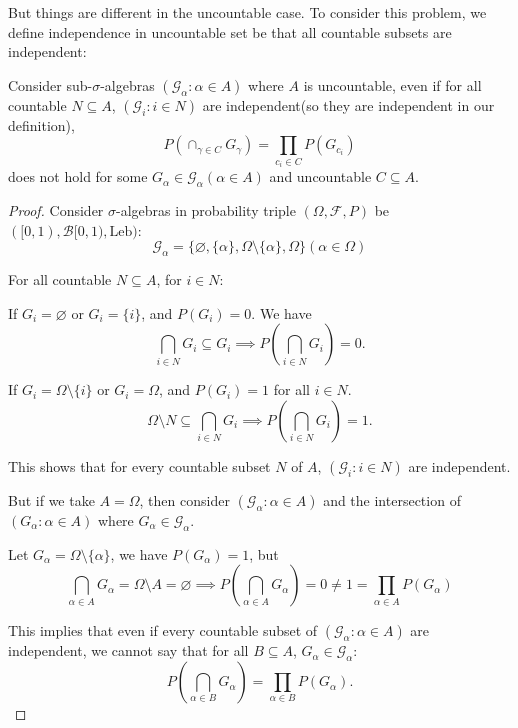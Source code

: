\documentclass[UTF8, a4paper, linespread=1.5]{article}
\begin{document}
But things are different in the uncountable case. To consider this problem, we define independence in uncountable set be that all countable subsets are independent:
\begin{thm}{}{}
    Consider sub-$\sigma$-algebras $(\mathcal{G}_\alpha :\alpha \in A)$ where $A$ is uncountable, even if
    for all countable $N \subseteq A$, $(\mathcal G_i: i \in N)$ are independent(so they are independent in our definition), 
    $$P(\cap_{\gamma\in C}G_\gamma)=\prod_{c_i\in C}P(G_{c_i})$$
    does not hold for some $G_\alpha \in\mathcal G_\alpha(\alpha \in A) $ and uncountable $C\subseteq A$.
\end{thm}
\begin{proof}[Proof]
    Consider $\sigma $-algebras in probability triple $(\Omega ,\mathcal F, P)$ be $([0,1), \mathcal B[0,1), \text{Leb})$:
    $$\mathcal G_\alpha = \{\varnothing, \{\alpha \}, \Omega \setminus \{\alpha \} , \Omega  \}(\alpha \in \Omega )$$

    For all countable $N \subseteq A$, for $i \in N$:

    If $G_i = \varnothing$ or $G_i = \{i \} $, and $P(G_i) = 0$. We have 
    $$\bigcap_{i \in N} G_i \subseteq G_i \implies P(\bigcap_{i \in N} G_i) = 0.$$

    If $G_i = \Omega \setminus\{i\}$ or $G_i = \Omega$, and $P(G_i) = 1$ for all $i \in N$. 
    $$\Omega \setminus N \subseteq \bigcap_{i\in N} G_i \implies P(\bigcap_{i \in N} G_i) = 1.$$

    This shows that for every countable subset $N$ of $A$, $(\mathcal G_i: i \in N)$ are independent.

    But if we take $A = \Omega $, then consider $(\mathcal G_\alpha : \alpha \in A)$ and the intersection of $(G_\alpha :\alpha \in A)$ where $G_\alpha \in \mathcal G_\alpha$.

    Let $G_\alpha  = \Omega \setminus \{\alpha \} $, we have $P(G_\alpha ) = 1$, but
    $$\bigcap_{\alpha \in A}G_\alpha = \Omega \setminus A = \varnothing \implies P(\bigcap_{\alpha \in A } G_\alpha ) = 0 \neq 1 = \prod_{\alpha \in A} P(G_\alpha)  $$

    This implies that even if every countable subset of $(\mathcal G_\alpha :\alpha \in A)$ are independent, we cannot say that for all $B \subseteq A$, $G_\alpha  \in \mathcal G_\alpha$:
    $$P(\bigcap_{\alpha \in B} G_\alpha ) = \prod_{\alpha \in B} P(G_\alpha).$$

\end{proof}
\end{document}
